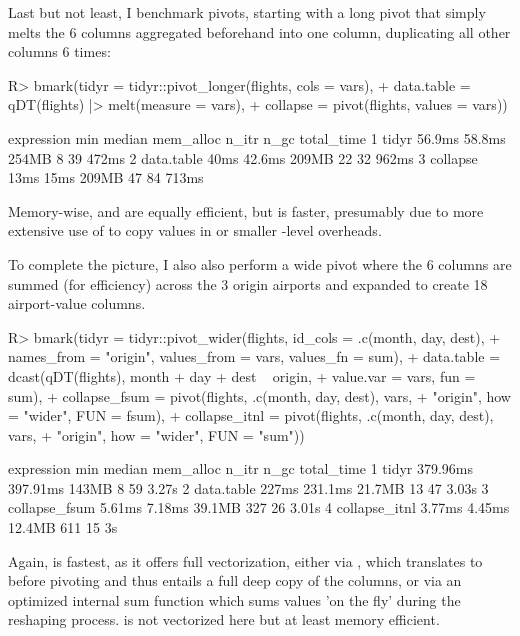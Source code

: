 \documentclass[nojss]{jss} %
\newcommand{\fct}[1]{\code{#1()}}
\begin{document}
Last but not least, I benchmark pivots, starting with a long pivot that simply melts the 6 columns aggregated beforehand into one column, duplicating all other columns 6 times:
%
\begin{Schunk}
\begin{Sinput}
R> bmark(tidyr = tidyr::pivot_longer(flights, cols = vars),
+        data.table = qDT(flights) |> melt(measure = vars),
+        collapse = pivot(flights, values = vars))
\end{Sinput}
\begin{Soutput}
  expression    min median mem_alloc n_itr n_gc total_time
1      tidyr 56.9ms 58.8ms     254MB     8   39      472ms
2 data.table   40ms 42.6ms     209MB    22   32      962ms
3   collapse   13ms   15ms     209MB    47   84      713ms
\end{Soutput}
\end{Schunk}
%
Memory-wise,  and  are equally efficient, but  is faster, presumably due to more extensive use of  to copy values in  or smaller -level overheads.

To complete the picture, I also also perform a wide pivot where the 6 columns are summed (for efficiency) across the 3 origin airports and expanded to create 18 airport-value columns.
%
\begin{Schunk}
\begin{Sinput}
R> bmark(tidyr = tidyr::pivot_wider(flights, id_cols = .c(month, day, dest),
+            names_from = "origin", values_from = vars, values_fn = sum),
+        data.table = dcast(qDT(flights), month + day + dest ~ origin,
+                           value.var = vars, fun = sum),
+        collapse_fsum = pivot(flights, .c(month, day, dest), vars,
+                              "origin", how = "wider", FUN = fsum),
+        collapse_itnl = pivot(flights, .c(month, day, dest), vars,
+                              "origin", how = "wider", FUN = "sum"))
\end{Sinput}
\begin{Soutput}
     expression      min   median mem_alloc n_itr n_gc total_time
1         tidyr 379.96ms 397.91ms     143MB     8   59      3.27s
2    data.table    227ms  231.1ms    21.7MB    13   47      3.03s
3 collapse_fsum   5.61ms   7.18ms    39.1MB   327   26      3.01s
4 collapse_itnl   3.77ms   4.45ms    12.4MB   611   15         3s
\end{Soutput}
\end{Schunk}
%
Again,  is fastest, as it offers full vectorization, either via \fct{fsum}, which translates to  before pivoting and thus entails a full deep copy of the  columns, or via an optimized internal sum function which sums values 'on the fly' during the reshaping process.  is not vectorized here but at least memory efficient. %
\end{document}
